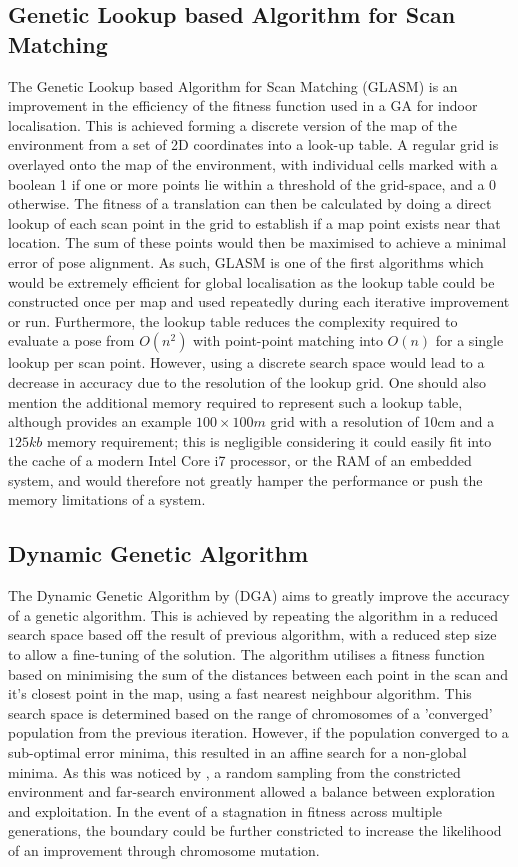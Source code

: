 \documentclass[authoryearcitations]{UoYCSproject}
\begin{document}
\subsection{Genetic Lookup based Algorithm for Scan Matching}
The Genetic Lookup based Algorithm for Scan Matching (GLASM) \cite{Lenac2007-xm} is an improvement in the efficiency of the fitness function used in a GA for indoor localisation. This is achieved forming a discrete version of the map of the environment from a set of 2D coordinates into a look-up table. A regular grid is overlayed onto the map of the environment, with individual cells marked with a boolean 1 if one or more points lie within a threshold of the grid-space, and a 0 otherwise. The fitness of a translation can then be calculated by doing a direct lookup of each scan point in the grid to establish if a map point exists near that location. The sum of these points would then be maximised to achieve a minimal error of pose alignment. As such, GLASM is one of the first algorithms which would be extremely efficient for global localisation as the lookup table could be constructed once per map and used repeatedly during each iterative improvement or run. Furthermore, the lookup table reduces the complexity required to evaluate a pose from $O(n^2)$ with point-point matching into $O(n)$ for a single lookup per scan point. However, using a discrete search space would lead to a decrease in accuracy due to the resolution of the lookup grid. One should also mention the additional memory required to represent such a lookup table, although \citeauthor{Lenac2007-xm} provides an example $100\times100m$ grid with a resolution of 10cm and a $125kb$ memory requirement; this is negligible considering it could easily fit into the cache of a modern Intel Core i7 processor, or the RAM of an embedded system, and would therefore not greatly hamper the performance or push the memory limitations of a system. 

\subsection{Dynamic Genetic Algorithm}
The Dynamic Genetic Algorithm by \citet{Chow2004-xc} (DGA) aims to greatly improve the accuracy of a genetic algorithm. This is achieved by repeating the algorithm in a reduced search space based off the result of previous algorithm, with a reduced step size to allow a fine-tuning of the solution. The algorithm utilises a fitness function based on minimising the sum of the distances between each point in the scan and it's closest point in the map, using a fast nearest neighbour algorithm. This search space is determined based on the range of chromosomes of a 'converged' population from the previous iteration. However, if the population converged to a sub-optimal error minima, this resulted in an affine search for a non-global minima. As this was noticed by \citeauthor{Chow2004-xc}, a random sampling from the constricted environment and far-search environment allowed a balance between exploration and exploitation. In the event of a stagnation in fitness across multiple generations, the boundary could be further constricted to increase the likelihood of an improvement through chromosome mutation. \newline
\end{document}
